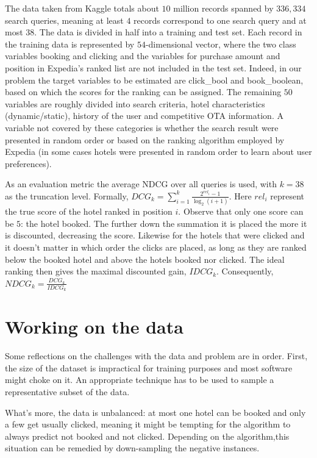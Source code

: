 \documentclass{llncs}
\begin{document}
The data taken from Kaggle totals about $10$ million records spanned by $336,334$ search queries, meaning at least $4$ records correspond to one search query and at most $38$. The data is divided in half into a training and test set. Each record in the training data is represented by $54$-dimensional vector, where the two class variables booking and clicking and the variables for purchase amount and position in Expedia's ranked list are not included in the test set. Indeed, in our problem the target variables to be estimated are click\_bool and book\_boolean, based on which the scores for the ranking can be assigned. The remaining $50$ variables are roughly divided into search criteria, hotel characteristics (dynamic/static), history of the user and competitive OTA information. A variable not covered by these categories is whether the search result were presented in random order or based on the ranking algorithm employed by Expedia (in some cases hotels were presented in random order to learn about user preferences).

As an evaluation metric the average NDCG over all queries is used, with $k=38$ as the truncation level. Formally, $\displaystyle DCG_{k}=\sum_{i=1}^{k}\frac{2^{rel_i}-1}{\log_{2}(i+1)}$. Here $rel_{i}$ represent the true score of the hotel ranked in position $i$. Observe that only one score can be $5$: the hotel booked. The further down the summation it is placed the more it is discounted, decreasing the score. Likewise for the hotels that were clicked and it doesn't matter in which order the clicks are placed, as long as they are ranked below the booked hotel and above the hotels booked nor clicked. The ideal ranking then gives the maximal discounted gain, $IDCG_{k}$. Consequently, $NDCG_{k}=\frac{DCG_{k}}{IDCG_{k}}$ 


\section{Working on the data}
Some reflections on the challenges with the data and problem are in order. First, the size of the dataset is impractical for training purposes and most software might choke on it. An appropriate technique has to be used to sample a representative subset of the data.

What's more, the data is unbalanced: at most one hotel can be booked and only a few get usually clicked, meaning it might be tempting for the algorithm to always predict not booked and not clicked. Depending on the algorithm,this situation can be remedied by down-sampling the negative instances.
\end{document}
